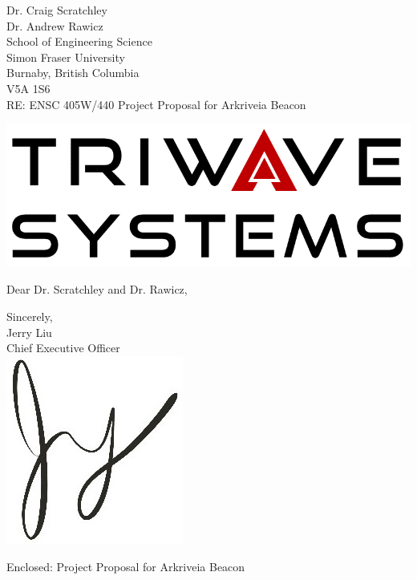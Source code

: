 \documentclass[11pt]{letter}
\date{July 21, 2019}
\begin{document}
\begin{letter}{
Dr. Craig Scratchley\\
Dr. Andrew Rawicz\\
School of Engineering Science\\
Simon Fraser University\\
Burnaby, British Columbia\\
V5A 1S6\\
\bigskip
RE: ENSC 405W/440 Project Proposal for Arkriveia Beacon\\
} 


\begin{center}
\includegraphics[scale=0.25]{./images/logo_W.png}
\end{center}


\opening{Dear Dr. Scratchley and Dr. Rawicz,} 
 
 
 
 
 
\medskip
Sincerely,\\
Jerry Liu\\
Chief Executive Officer\\

\vspace*{-0.25cm}
\includegraphics[scale=0.8]{./images/signature.jpg}

{Enclosed: Project Proposal for Arkriveia Beacon}

\end{letter}
\end{document}
